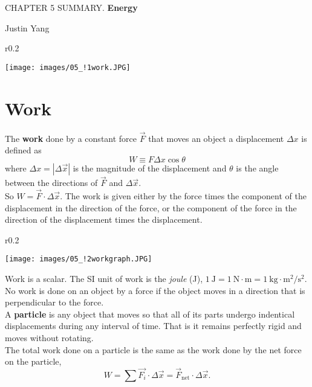 \documentclass[11pt,a4paper]{report}
\begin{document}
\setcounter{secnumdepth}{0}

\begin{center}
\Large{CHAPTER 5 SUMMARY. \textbf{Energy}}

\large{Justin Yang}

\end{center}

\begin{wrapfigure}{r}{0.2\textwidth}
\begin{center}
\texttt{[image: images/05\_!1work.JPG]}
\end{center}
\end{wrapfigure}

\section{Work}
The \textbf{work} done by a constant force $\vec{F}$ that moves an object a displacement $\Delta{x}$ is defined as $$W \equiv F \Delta{x} \cos{\theta}$$ where $\Delta{x} = \left|\Delta{\vec{x}}\right|$ is the magnitude of the displacement and $\theta$ is the angle between the directions of $\vec{F}$ and $\Delta{\vec{x}}$.
\\So $W = \vec{F} \cdot \Delta{\vec{x}}$. The work is given either by the force times the component of the displacement in the direction of the force, or the component of the force in the direction of the displacement times the displacement.

\begin{wrapfigure}{r}{0.2\textwidth}
\vspace{-20pt}
\begin{center}
\texttt{[image: images/05\_!2workgraph.JPG]}
\end{center}
\vspace{-20pt}
\end{wrapfigure}

\noindent
Work is a scalar. The SI unit of work is the \textit{joule} (J), $1 \mathrm{\ J} = 1 \mathrm{\ N} \cdot \mathrm{m} = 1 \mathrm{\ kg} \cdot \mathrm{m}^2 / \mathrm{s}^2$.
\\No work is done on an object by a force if the object moves in a direction that is perpendicular to the force.
\\A \textbf{particle} is any object that moves so that all of its parts undergo indentical displacements during any interval of time. That is it remains perfectly rigid and moves without rotating.
\\The total work done on a particle is the same as the work done by the net force on the particle, $$W = \sum{\vec{F_i}} \cdot \Delta{\vec{x}} = \vec{F}_\mathrm{net} \cdot \Delta{\vec{x}}.$$
\end{document}
